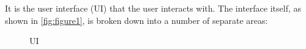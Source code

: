 It is the user interface (UI) that the user interacts with. The interface itself, as
shown in \autoref{fig:figure1}, is broken down into a number of separate areas:

\begin{figure}[!htbp]
  \caption{UI}
  \label{fig:figure1}
\end{figure}

